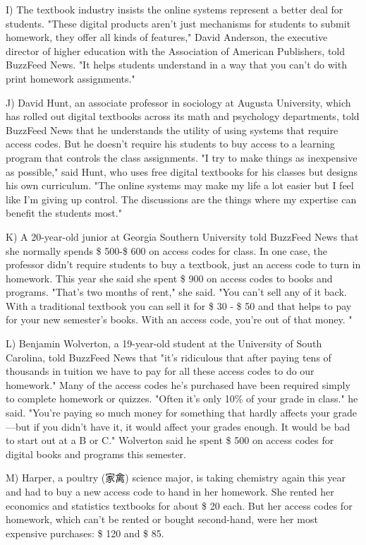 \documentclass[UTF8,11pt]{ctexart}
\begin{document}
I) The textbook industry insists the online systems represent a better deal for students. "These digital products aren't just mechanisms for students to submit homework, they offer all kinds of features," David Anderson, the executive director of higher education with the Association of American Publishers, told BuzzFeed News. "It helps students understand in a way that you can't do with print homework assignments."


J) David Hunt, an associate professor in sociology at Augusta University, which has rolled out digital textbooks across its math and psychology departments, told BuzzFeed News that he understands the utility of using systems that require access codes. But he doesn't require his students to buy access to a learning program that controls the class assignments. "I try to make things as inexpensive as possible," said Hunt, who uses free digital textbooks for his classes but designs his own curriculum. "The online systems may make my life a lot easier but I feel like I'm giving up control. The discussions are the things where my expertise can benefit the students most."


K) A 20-year-old junior at Georgia Southern University told BuzzFeed News that she normally spends \$ 500-\$ 600 on access codes for class. In one case, the professor didn't require students to buy a textbook, just an access code to turn in homework. This year she said she spent \$ 900 on access codes to books and programs. "That's two months of rent," she said. "You can't sell any of it back. With a traditional textbook you can sell it for \$ 30 - \$ 50 and that helps to pay for your new semester's books. With an access code, you're out of that money. "


L) Benjamin Wolverton, a 19-year-old student at the University of South Carolina, told BuzzFeed News that "it's ridiculous that after paying tens of thousands in tuition we have to pay for all these access codes to do our homework." Many of the access codes he's purchased have been required simply to complete homework or quizzes. "Often it's only 10\% of your grade in class." he said. "You're paying so much money for something that hardly affects your grade—but if you didn't have it, it would affect your grades enough. It would be bad to start out at a B or C." Wolverton said he spent \$ 500 on access codes for digital books and programs this semester.


M) Harper, a poultry (家禽) science major, is taking chemistry again this year and had to buy a new access code to hand in her homework. She rented her economics and statistics textbooks for about \$ 20 each. But her access codes for homework, which can't be rented or bought second-hand, were her most expensive purchases: \$ 120 and \$ 85.
\end{document}

